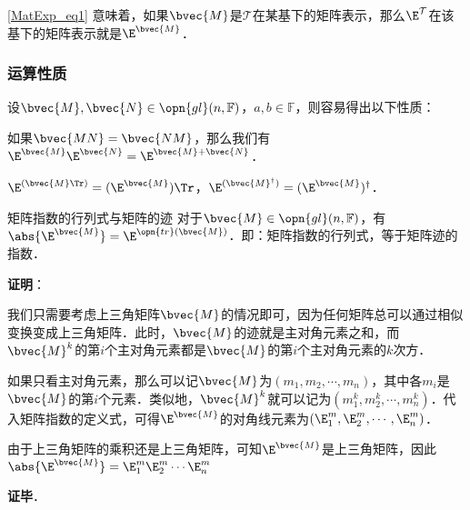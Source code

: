 \autoref{MatExp_eq1} 意味着，如果$\bvec{M}$是$\mathcal{T}$在某基下的矩阵表示，那么$\E^\mathcal{T}$在该基下的矩阵表示就是$\E^\bvec{M}$．

\subsubsection{运算性质}

设$\bvec{M}, \bvec{N}\in \opn{gl}(n, \mathbb{F})$，$a, b\in\mathbb{F}$，则容易得出以下性质：

如果$\bvec{MN}=\bvec{NM}$，那么我们有$\E^{\bvec{M}}\E^{\bvec{N}}=\E^{\bvec{M}+\bvec{N}}$．

$\E^{(\bvec{M}\Tr)}=({\E^\bvec{M}})\Tr$，$\E^{(\bvec{M}^\dagger)}=({\E^\bvec{M}})^\dagger$．

\begin{theorem}{矩阵指数的行列式与矩阵的迹}
对于$\bvec{M}\in\opn{gl}(n, \mathbb{F})$，有$\abs{\E^\bvec{M}}=\E^{\opn{tr}(\bvec{M})}$．即：矩阵指数的行列式，等于矩阵迹的指数．
\end{theorem}

\textbf{证明}：

我们只需要考虑上三角矩阵$\bvec{M}$的情况即可，因为任何矩阵总可以通过相似变换变成上三角矩阵．此时，$\bvec{M}$的迹就是主对角元素之和，而$\bvec{M}^k$的第$i$个主对角元素都是$\bvec{M}$的第$i$个主对角元素的$k$次方．

如果只看主对角元素，那么可以记$\bvec{M}$为$(m_1, m_2,\cdots,m_n)$，其中各$m_i$是$\bvec{M}$的第$i$个元素．类似地，$\bvec{M}^k$就可以记为$(m_1^k, m_2^k,\cdots,m_n^k)$．代入矩阵指数的定义式，可得$\E^{\bvec{M}}$的对角线元素为$(\E^m_1, \E^m_2,\cdots, \E^m_n)$．

由于上三角矩阵的乘积还是上三角矩阵，可知$\E^{\bvec{M}}$是上三角矩阵，因此$\abs{\E^\bvec{M}}=\E^m_1\E^m_2\cdots\E^m_n$

\textbf{证毕}．








